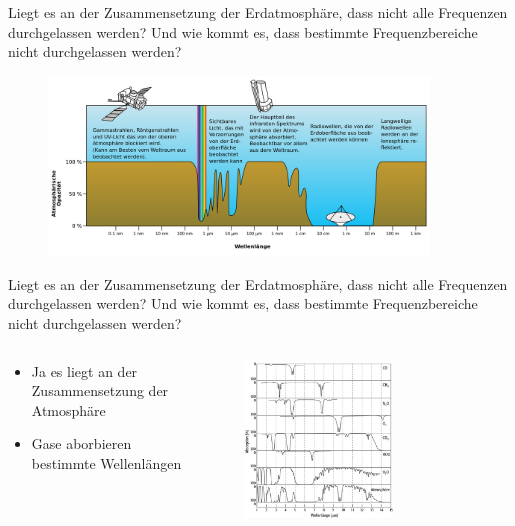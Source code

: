 \begin{frame}{Liegt es an der Zusammensetzung der Erdatmosphäre, dass nicht alle Frequenzen durchgelassen werden? Und wie kommt es, dass bestimmte Frequenzbereiche nicht durchgelassen werden?}
  \begin{figure}
    \centering
    \includegraphics[width=0.9\textwidth]{images/Atmospheric.png}
  \end{figure}
\end{frame}
  \begin{frame}{Liegt es an der Zusammensetzung der Erdatmosphäre, dass nicht alle Frequenzen durchgelassen werden? Und wie kommt es, dass bestimmte Frequenzbereiche nicht durchgelassen werden?}
    \begin{columns}
   \begin{column}{0.4\textwidth}
    \begin{itemize}
      \item Ja es liegt an der Zusammensetzung der Atmosphäre
      \item Gase aborbieren bestimmte Wellenlängen
    \end{itemize}
  \vspace{2em}
  \end{column}
  \begin{column}{0.6\textwidth}
    \begin{figure}
      \centering
      \includegraphics[width=0.65\textwidth]{images/atmo_fen_w.jpg}
    \end{figure}
  \end{column}
    \end{columns}
  \end{frame}


